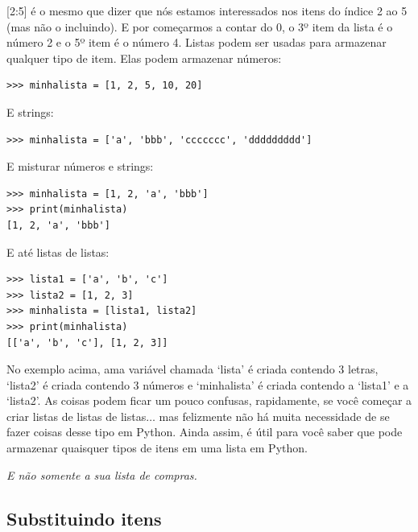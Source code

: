 [2:5] é o mesmo que dizer que nós estamos interessados nos itens do índice 2 ao 5 (mas não o incluindo). E por começarmos a contar do 0, o 3º item da lista é o número 2 e o 5º item é o número 4. Listas podem ser usadas para armazenar qualquer tipo de item. Elas podem armazenar números:

\begin{listing}
\begin{verbatim}
>>> minhalista = [1, 2, 5, 10, 20]
\end{verbatim}
\end{listing}

\noindent
E strings:

\begin{listing}
\begin{verbatim}
>>> minhalista = ['a', 'bbb', 'ccccccc', 'ddddddddd']
\end{verbatim}
\end{listing}

\noindent
E misturar números e strings:

\begin{listing}
\begin{verbatim}
>>> minhalista = [1, 2, 'a', 'bbb']
>>> print(minhalista)
[1, 2, 'a', 'bbb']
\end{verbatim}
\end{listing}

\noindent
E até listas de listas:

\begin{listing}
\begin{verbatim}
>>> lista1 = ['a', 'b', 'c']
>>> lista2 = [1, 2, 3]
>>> minhalista = [lista1, lista2]
>>> print(minhalista)
[['a', 'b', 'c'], [1, 2, 3]]
\end{verbatim}
\end{listing}

No exemplo acima, ama variável chamada `lista' é criada contendo 3 letras, `lista2' é criada contendo 3 números e `minhalista' é criada contendo a `lista1' e a `lista2'. As coisas podem ficar um pouco confusas, rapidamente, se você começar a criar listas de listas de listas$\ldots$ mas felizmente não há muita necessidade de se fazer coisas desse tipo em Python. Ainda assim, é útil para você saber que pode armazenar quaisquer tipos de itens em uma lista em Python.

\noindent
\emph{E não somente a sua lista de compras.}

\subsection*{\color{BrickRed}Substituindo itens}

